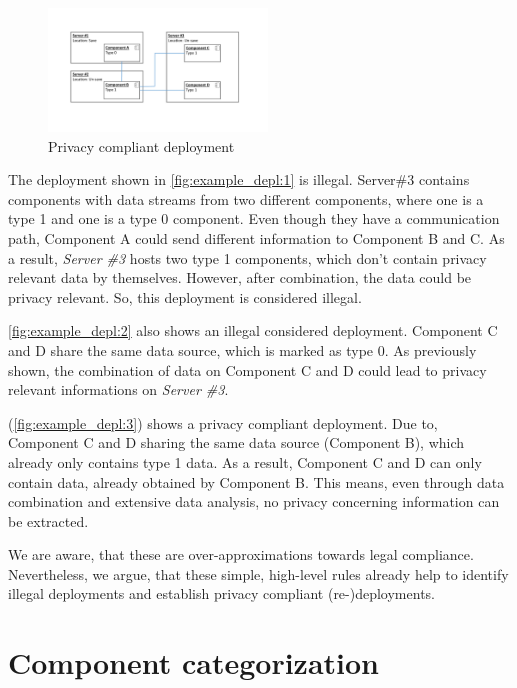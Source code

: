 	
\begin{figure}
	\begin{center}
		\includegraphics[trim = 35mm 45mm 40mm 35mm, clip, width=0.52\textwidth]{graphs/deployment_example_3}
	\end{center}
	\caption{Privacy compliant deployment}
	\label{fig:example_depl:3}
\end{figure}

The deployment shown in \autoref{fig:example_depl:1} is illegal. Server\#3 contains components with data streams from two different components, where one is a type 1 and one is a type 0 component. Even though they have a communication path, Component A could send different information to Component B and C. As a result, \textit{Server \#3} hosts two type 1 components, which don't contain privacy relevant data by themselves. However, after combination, the data could be privacy relevant. So, this deployment is considered illegal.

\autoref{fig:example_depl:2} also shows an illegal considered deployment. Component C and D share the same data source, which is marked as type 0. As previously shown, the combination of data on Component C and D could lead to privacy relevant informations on \textit{Server \#3}.

(\autoref{fig:example_depl:3}) shows a privacy compliant deployment. Due to, Component C and D sharing the same data source (Component B), which already only contains type 1 data. As a result, Component C and D can only contain data, already obtained by Component B. This means, even through data combination and extensive data analysis, no privacy concerning information can be extracted.

We are aware, that these are over-approximations towards legal compliance. Nevertheless, we argue, that these simple, high-level rules already help to identify illegal deployments and establish privacy compliant (re-)deployments.


\section{Component categorization}
\label{sec:PrivacyConcept:comp_cat}

